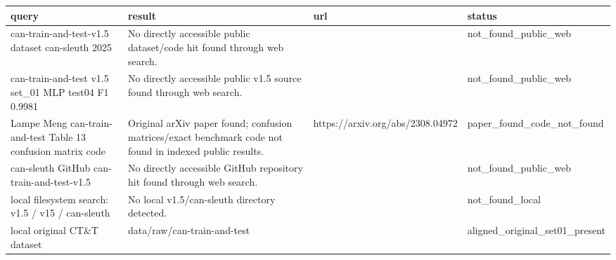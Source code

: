 \begin{tabular}{llll}
\toprule
query & result & url & status \\
\midrule
can-train-and-test-v1.5 dataset can-sleuth 2025 & No directly accessible public dataset/code hit found through web search. &  & not\_found\_public\_web \\
can-train-and-test v1.5 set\_01 MLP test04 F1 0.9981 & No directly accessible public v1.5 source found through web search. &  & not\_found\_public\_web \\
Lampe Meng can-train-and-test Table 13 confusion matrix code & Original arXiv paper found; confusion matrices/exact benchmark code not found in indexed public results. & https://arxiv.org/abs/2308.04972 & paper\_found\_code\_not\_found \\
can-sleuth GitHub can-train-and-test-v1.5 & No directly accessible GitHub repository hit found through web search. &  & not\_found\_public\_web \\
local filesystem search: v1.5 / v15 / can-sleuth & No local v1.5/can-sleuth directory detected. &  & not\_found\_local \\
local original CT\&T dataset & data/raw/can-train-and-test &  & aligned\_original\_set01\_present \\
\bottomrule
\end{tabular}
